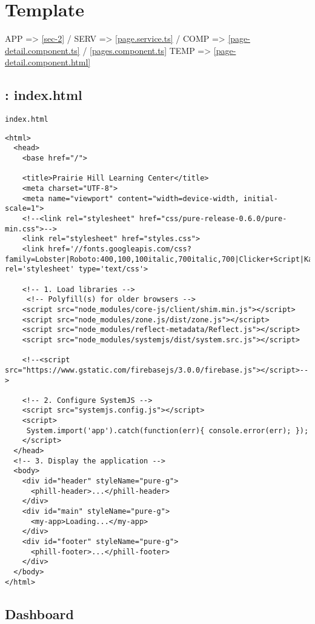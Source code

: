 \documentclass[11pt]{article}
\begin{document}
\section{Template}
\label{sec-3}

APP  => \ref{sec-2} /
SERV => \ref{page.service.ts} /
COMP => \ref{page-detail.component.ts} / \ref{pages.component.ts}
TEMP => \ref{page-detail.component.html}

\subsection{: index.html}
\label{sec-3-1}
\begin{verbatim}
index.html
\end{verbatim}
\begin{verbatim}
<html>
  <head>
    <base href="/">

    <title>Prairie Hill Learning Center</title>
    <meta charset="UTF-8">
    <meta name="viewport" content="width=device-width, initial-scale=1">
    <!--<link rel="stylesheet" href="css/pure-release-0.6.0/pure-min.css">-->
    <link rel="stylesheet" href="styles.css">
    <link href='//fonts.googleapis.com/css?family=Lobster|Roboto:400,100,100italic,700italic,700|Clicker+Script|Kaushan+Script|News+Cycle:400,700|BenchNine|Poiret+One|Open+Sans+Condensed:300|Playball|Shadows+Into+Light+Two' rel='stylesheet' type='text/css'>

    <!-- 1. Load libraries -->
     <!-- Polyfill(s) for older browsers -->
    <script src="node_modules/core-js/client/shim.min.js"></script>
    <script src="node_modules/zone.js/dist/zone.js"></script>
    <script src="node_modules/reflect-metadata/Reflect.js"></script>
    <script src="node_modules/systemjs/dist/system.src.js"></script>

    <!--<script src="https://www.gstatic.com/firebasejs/3.0.0/firebase.js"></script>-->

    <!-- 2. Configure SystemJS -->
    <script src="systemjs.config.js"></script>
    <script>
     System.import('app').catch(function(err){ console.error(err); });
    </script>
  </head>
  <!-- 3. Display the application -->
  <body>
    <div id="header" styleName="pure-g">
      <phill-header>...</phill-header>
    </div>
    <div id="main" styleName="pure-g">
      <my-app>Loading...</my-app>
    </div>
    <div id="footer" styleName="pure-g">
      <phill-footer>...</phill-footer>
    </div>
  </body>
</html>
\end{verbatim}

\subsection{Dashboard}
\label{sec-3-2}
\end{document}
